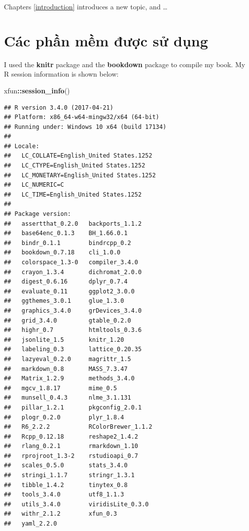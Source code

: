 \documentclass[]{krantz}
\makeatletter
\newenvironment{Shaded}{\begin{snugshade}}{\end{snugshade}}
\newcommand{\KeywordTok}[1]{\textcolor[rgb]{0.27,0.27,0.27}{\textbf{#1}}}
\newcommand{\NormalTok}[1]{#1}
\newcommand{\OperatorTok}[1]{\textcolor[rgb]{0.43,0.43,0.43}{\textbf{#1}}}
\newenvironment{kframe}{%
\medskip{}
\setlength{\fboxsep}{.8em}
 \def\at@end@of@kframe{}%
 \ifinner\ifhmode%
  \def\at@end@of@kframe{\end{minipage}}%
  \begin{minipage}{\columnwidth}%
 \fi\fi%
 \def\FrameCommand##1{\hskip\@totalleftmargin \hskip-\fboxsep
 \colorbox{shadecolor}{##1}\hskip-\fboxsep
     \hskip-\linewidth \hskip-\@totalleftmargin \hskip\columnwidth}%
 \MakeFramed {\advance\hsize-\width
   \@totalleftmargin\z@ \linewidth\hsize
   \@setminipage}}%
 {\par\unskip\endMakeFramed%
 \at@end@of@kframe}
\renewenvironment{Shaded}{\begin{kframe}}{\end{kframe}}
\renewenvironment{Shaded}{\begin{snugshade}}{\end{snugshade}}
\renewcommand{\KeywordTok}[1]{\textcolor[rgb]{0.13,0.29,0.53}{\textbf{#1}}}
\renewcommand{\NormalTok}[1]{#1}
\renewcommand{\OperatorTok}[1]{\textcolor[rgb]{0.81,0.36,0.00}{\textbf{#1}}}
\theoremstyle{definition}
\theoremstyle{definition}
\theoremstyle{definition}
\theoremstyle{remark}
\makeatother
\begin{document}
Chapters \ref{introduction} introduces a new topic, and \ldots{}

\hypertarget{cac-phn-mm-uc-s-dung}{%
\section*{Các phần mềm được sử dụng}\label{cac-phn-mm-uc-s-dung}}


I used the \textbf{knitr} package \citep{xie2015} and the
\textbf{bookdown} package \citep{R-bookdown} to compile
my book. My R session information is shown below:

\begin{Shaded}
\begin{Highlighting}[]
\NormalTok{xfun}\OperatorTok{::}\KeywordTok{session_info}\NormalTok{()}
\end{Highlighting}
\end{Shaded}

\begin{verbatim}
## R version 3.4.0 (2017-04-21)
## Platform: x86_64-w64-mingw32/x64 (64-bit)
## Running under: Windows 10 x64 (build 17134)
## 
## Locale:
##   LC_COLLATE=English_United States.1252 
##   LC_CTYPE=English_United States.1252   
##   LC_MONETARY=English_United States.1252
##   LC_NUMERIC=C                          
##   LC_TIME=English_United States.1252    
## 
## Package version:
##   assertthat_0.2.0   backports_1.1.2   
##   base64enc_0.1.3    BH_1.66.0.1       
##   bindr_0.1.1        bindrcpp_0.2      
##   bookdown_0.7.18    cli_1.0.0         
##   colorspace_1.3-0   compiler_3.4.0    
##   crayon_1.3.4       dichromat_2.0.0   
##   digest_0.6.16      dplyr_0.7.4       
##   evaluate_0.11      ggplot2_3.0.0     
##   ggthemes_3.0.1     glue_1.3.0        
##   graphics_3.4.0     grDevices_3.4.0   
##   grid_3.4.0         gtable_0.2.0      
##   highr_0.7          htmltools_0.3.6   
##   jsonlite_1.5       knitr_1.20        
##   labeling_0.3       lattice_0.20.35   
##   lazyeval_0.2.0     magrittr_1.5      
##   markdown_0.8       MASS_7.3.47       
##   Matrix_1.2.9       methods_3.4.0     
##   mgcv_1.8.17        mime_0.5          
##   munsell_0.4.3      nlme_3.1.131      
##   pillar_1.2.1       pkgconfig_2.0.1   
##   plogr_0.2.0        plyr_1.8.4        
##   R6_2.2.2           RColorBrewer_1.1.2
##   Rcpp_0.12.18       reshape2_1.4.2    
##   rlang_0.2.1        rmarkdown_1.10    
##   rprojroot_1.3-2    rstudioapi_0.7    
##   scales_0.5.0       stats_3.4.0       
##   stringi_1.1.7      stringr_1.3.1     
##   tibble_1.4.2       tinytex_0.8       
##   tools_3.4.0        utf8_1.1.3        
##   utils_3.4.0        viridisLite_0.3.0 
##   withr_2.1.2        xfun_0.3          
##   yaml_2.2.0
\end{verbatim}
\end{document}
